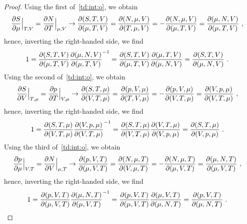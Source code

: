     \begin{proof}
        Using the first of~\eqref{td:int:o}, we obtain
        \begin{equation*}
            \frac{\partial S}{\partial\mu} \Big \vert_{T, V} = \frac{\partial N}{\partial T} \Big \vert_{\mu, V} \rightarrow \frac{\partial(S, T, V)}{\partial(\mu, T, V)} = \frac{\partial(N, \mu, V)}{\partial(T, \mu, V)} = - \frac{\partial(N, \mu, V)}{\partial(\mu, T, V)} = \frac{\partial(\mu, N, V)}{\partial(\mu, T, V)} ~,
        \end{equation*} 
        hence, inverting the right-handed side, we find
        \begin{equation*}
            1 = \frac{\partial(S, T, V)}{\partial(\mu, T, V)} \frac{\partial(\mu, N, V)}{\partial(\mu, T, V)}^{-1} = \frac{\partial(S, T, V)}{\partial(\mu, T, V)} \frac{\partial(\mu, T, V)}{\partial(\mu, N, V)} = \frac{\partial(S, T, V)}{\partial(\mu, N, V)} ~.
        \end{equation*} 
        Using the second of~\eqref{td:int:o}, we obtain
        \begin{equation*}
            \frac{\partial S}{\partial V} \Big \vert_{T, \mu} = \frac{\partial p}{\partial T} \Big \vert_{V, \mu} \rightarrow \frac{\partial(S, T, \mu)}{\partial(V, T, \mu)} = \frac{\partial(p, V, \mu)}{\partial(T, V, \mu)} = - \frac{\partial(p, V, \mu)}{\partial(V, T, \mu)} = \frac{\partial(V, p, \mu)}{\partial(V, T, \mu)} ~,
        \end{equation*} 
        hence, inverting the right-handed side, we find
        \begin{equation*}
            1 = \frac{\partial(S, T, \mu)}{\partial(V, T, \mu)} \frac{\partial(V, p, \mu)}{\partial(V, T, \mu)}^{-1} = \frac{\partial(S, T, \mu)}{\partial(V, T, \mu)} \frac{\partial(V, T, \mu)}{\partial(V, p, \mu)} = \frac{\partial(S, T, \mu)}{\partial(V, p, \mu)} ~.
        \end{equation*} 
        Using the third of~\eqref{td:int:o}, we obtain
        \begin{equation*}
            \frac{\partial p}{\partial\mu} \Big \vert_{V, T} = \frac{\partial N}{\partial V} \Big \vert_{\mu, T} \rightarrow \frac{\partial(p, V, T)}{\partial(\mu, V, T)} = \frac{\partial(N, \mu, T)}{\partial(V, \mu, T)} = - \frac{\partial(N, \mu, T)}{\partial(\mu, V, T)} = \frac{\partial(\mu, N, T)}{\partial(\mu, V, T)} ~,
        \end{equation*} 
        hence, inverting the right-handed side, we find
        \begin{equation*}
            1 = \frac{\partial(p, V, T)}{\partial(\mu, V, T)} \frac{\partial(\mu, N, T)}{\partial(\mu, V, T)}^{-1} = \frac{\partial(p, V, T)}{\partial(\mu, V, T)} \frac{\partial(\mu, V, T)}{\partial(\mu, N, T)} = \frac{\partial(p, V, T)}{\partial(\mu, N, T)} ~.
        \end{equation*} 
    \end{proof}

